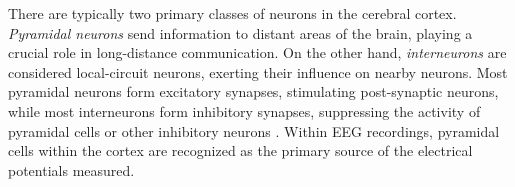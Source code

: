 \documentclass[a4paper, UKenglish, 11pt]{uiomaster}
\begin{document}
There are typically two primary classes of neurons in the cerebral cortex. \emph{Pyramidal neurons} send information to distant areas of the brain, playing a crucial role in long-distance communication. On the other hand, \emph{interneurons} are considered local-circuit neurons, exerting their influence on nearby neurons. Most pyramidal neurons form excitatory synapses, stimulating post-synaptic neurons, while most interneurons form inhibitory synapses, suppressing the activity of pyramidal cells or other inhibitory neurons \cite{bromfield2006introduction}. Within EEG recordings, pyramidal cells within the cortex are recognized as the primary source of the electrical potentials measured.




%
%
%


\end{document}
